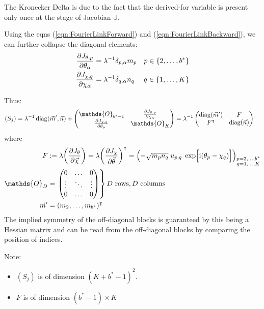 \documentclass[
	english,
	a4paper,
	fontsize=10pt,
	parskip=half,
	titlepage=true,
	DIV=12,
	final
]{scrreprt}
\newcommand*{\transp}{\ensuremath{^\intercal}}
\newcommand*{\iunit}{\ensuremath{\mathrm{i}}}
\DeclareMathOperator{\diag}{diag}
\begin{document}
The Kronecker Delta is due to the fact that the derived-for variable is present only once at the stage of Jacobian $\mathbb{J}$.

Using the eqns (\ref{eqn:FourierLinkForward}) and (\ref{eqn:FourierLinkBackward}), we can further collapse the diagonal elements:
\begin{align}
	\pdv{J_{\theta, p}}{\theta_{\alpha}}
&=
	\lambda^{-1}
	\delta_{p,\alpha}
	m_p
&
	p \in \{2, \ldots, b^*\}
\\
	\pdv{J_{\chi, q}}{\chi_{\alpha}}
&=
	\lambda^{-1}
	\delta_{q,\alpha}
	n_q
&
	q \in \{1, \ldots, K\}
\end{align}

Thus:
\begin{align}
	(S_j)
&=
	\lambda^{-1}
	\diag(\vec{m}', \vec{n})
	+
	\begin{pmatrix}
		\mathds{O}_{b^*-1} & 
		\pdv{J_{\theta, p}}{\chi_{\alpha}}
		\\
		\pdv{J_{\chi, q}}{\theta_{\alpha}} &
		\mathds{O}_{K}
	\end{pmatrix}
=
	\lambda^{-1}
	\begin{pmatrix}
		\diag(\vec{m}') & F 			\\
		F\transp & \diag(\vec{n})
	\end{pmatrix}
\end{align}
where
\begin{align}
	F
&:=
	\lambda \qty( \pdv{J_{\theta}}{\vec{\chi}} ) 
	= \lambda \qty( \pdv{J_{\chi}}{\vec{\theta}} )\transp
	= \qty( -\sqrt{m_p n_q} \; u_{p,q} \; \exp[\Big. \iunit(\theta_p - \chi_q)] )_{
		\substack{p = 2, \ldots, b^* \\ q = 1, \ldots, K}
	}
\\
	\mathds{O}_{D}
&=	
	\left.
	\mqty(
		0		& \ldots		& 0 \\
		\vdots	& \ddots 	& \vdots \\
		0		& \ldots		& 0
	)
	\right\} D \text{ rows}, D \text{ columns}
\\
	\vec{m}'
&=
	(m_2, \ldots, m_{b^*})\transp
\end{align}
The implied symmetry of the off-diagonal blocks is guaranteed by this being a Hessian matrix and can be read from the off-diagonal blocks by comparing the position of indices.

Note:
\begin{itemize}
\item $(S_j)$ is of dimension $(K + b^* - 1)^{2}$.
\item $F$ is of dimension $(b^* - 1) \times K$
\end{itemize}
\end{document}
